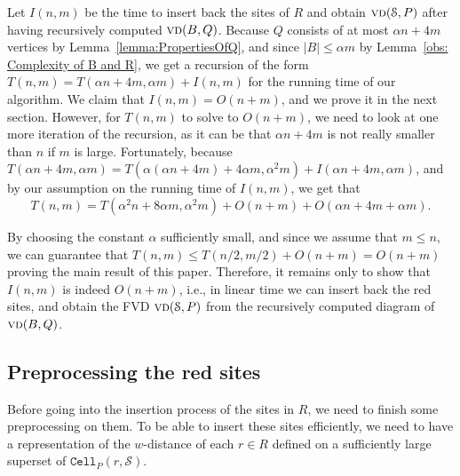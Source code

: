 \documentclass[a4paper,UKenglish]{socg-lipics-v2018}
\newcommand{\s}{\mathcal S}
\newcommand{\cell}[2][P]{\ensuremath{\mathtt{Cell}_{\scriptscriptstyle #1}(#2)}}
\newcommand{\vd}[2][P]{\textsc{vd}(#2, #1)}
\newcommand{\bvd}[2][P]{\textsc{vd}_{\partial}(#2, #1)}
\newcommand{\LL}[1][\s, P]{\ensuremath{\mathcal L_{_{#1}}}}
\newcommand{\A}{\ensuremath{\mathcal A}}
\begin{document}
Let $I(n,m)$ be the time to insert back the sites of $R$ and obtain $\vd{\s}$ after having recursively computed $\vd[Q]{B}$.
Because $Q$ consists of at most $\alpha n + 4m$ vertices by Lemma~\ref{lemma:PropertiesOfQ}, and since $|B|\leq \alpha m$ by Lemma~\ref{obs: Complexity of B and R}, we get a recursion of the form $T(n, m) = T(\alpha n + 4m, \alpha m) + I(n,m)$ for the running time of our algorithm. 
We claim that $I(n,m) = O(n+m)$, and we prove it in the next section.
However, for $T(n,m)$ to solve to $O(n+ m)$, we need to look at one more iteration of the recursion, as it can be that $\alpha n + 4m$ is not really smaller than $n$ if $m$ is large. 
Fortunately, because $T(\alpha n + 4m, \alpha m) = T(\alpha(\alpha n + 4m) + 4\alpha m, \alpha^2 m) + I(\alpha n + 4m, \alpha m)$, and by our assumption on the running time of $I(n,m)$, we get that
\[T(n,m) = T(\alpha^2 n + 8\alpha m, \alpha^2 m) + O(n+m) + O(\alpha n + 4m + \alpha m).\]

By choosing the constant $\alpha$ sufficiently small, and since we assume that $m\leq n$, we can guarantee that $T(n, m) \leq T(n/2, m/2) + O(n + m) = O(n +m)$ proving the main result of this paper.
Therefore, it remains only to show that $I(n,m)$ is indeed $O(n+ m)$, i.e., in linear time we can insert back the red sites, and obtain the FVD $\vd{\s}$ from the recursively computed diagram of $\vd[Q]{B}$.


\subsection{Preprocessing the red sites}\label{sec: Preprocessing of red sites}
Before going into the insertion process of the sites in $R$, we need to finish some preprocessing on them.
To be able to insert these sites efficiently, we need to have a representation of the $w$-distance of each $r\in R$ defined on a sufficiently large superset of $\cell{r, \s}$. 
\end{document}
